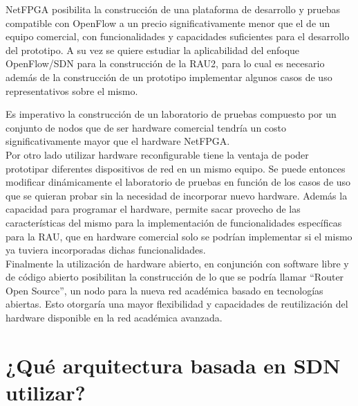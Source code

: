 NetFPGA posibilita la construcci\'on de una plataforma de desarrollo y pruebas compatible con OpenFlow a un precio significativamente menor que el de un equipo comercial, con funcionalidades y capacidades suficientes para el desarrollo del prototipo. A su vez se quiere estudiar la aplicabilidad del enfoque OpenFlow/SDN para la construcción de la RAU2, para lo cual es necesario adem\'as de la construcción de un prototipo implementar algunos casos de uso representativos sobre el mismo. 

Es imperativo la construcción de un laboratorio de pruebas compuesto por un conjunto de nodos que de ser hardware comercial tendría un costo significativamente mayor que el hardware NetFPGA.\\

Por otro lado utilizar hardware reconfigurable tiene la ventaja de poder prototipar diferentes dispositivos de red en un mismo equipo. Se puede entonces modificar din\'amicamente el laboratorio de pruebas en función de los casos de uso que se quieran probar sin la necesidad de incorporar nuevo hardware. Adem\'as la capacidad para programar el hardware, permite sacar provecho de las características del mismo para la implementaci\'on de funcionalidades espec\'ificas para la RAU, que en hardware comercial solo se podrían implementar si el mismo ya tuviera incorporadas dichas funcionalidades.\\

Finalmente la utilizaci\'on de hardware abierto, en conjunci\'on con software libre y de código abierto posibilitan la construcci\'on de lo que se podría llamar “Router Open Source”, un nodo para la nueva red académica basado en tecnologías abiertas. Esto otorgaría una mayor flexibilidad y capacidades de reutilizaci\'on del hardware disponible en la red académica avanzada.

\section[¿Qu\'e arquitectura basada en SDN utilizar?]{¿Qu\'e arquitectura basada en SDN utilizar?}


 
